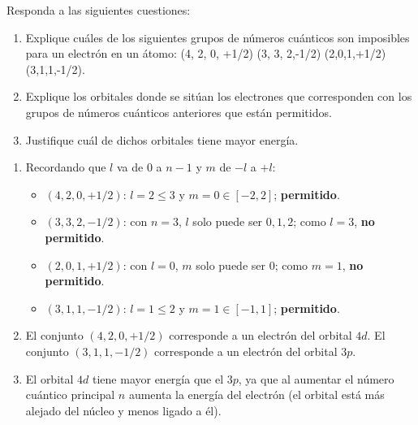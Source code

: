 \begin{exerciseEVAU}
    Responda a las siguientes cuestiones:
    \begin{enumerate}[label=\letraminuscula]
        \item Explique cuáles de los siguientes grupos de números cuánticos son imposibles para un
electrón en un átomo: (4, 2, 0, +1/2) (3, 3, 2,-1/2) (2,0,1,+1/2) (3,1,1,-1/2).
        \item Explique los orbitales donde se sitúan los electrones que corresponden con los grupos de números cuánticos anteriores que están permitidos.
        \item Justifique cuál de dichos orbitales tiene mayor energía.
    \end{enumerate}
    \begin{solu}
        \begin{enumerate}[label=\letraminuscula]
            \item Recordando que \(l\) va de \(0\) a \(n-1\) y \(m\) de \(-l\) a \(+l\):
            \begin{itemize}
                \item \((4,2,0,+1/2)\): \(l=2\leq 3\) y \(m=0\in[-2,2]\); \textbf{permitido}.
                \item \((3,3,2,-1/2)\): con \(n=3\), \(l\) solo puede ser \(0,1,2\); como \(l=3\), \textbf{no permitido}.
                \item \((2,0,1,+1/2)\): con \(l=0\), \(m\) solo puede ser \(0\); como \(m=1\), \textbf{no permitido}.
                \item \((3,1,1,-1/2)\): \(l=1\leq 2\) y \(m=1\in[-1,1]\); \textbf{permitido}.
            \end{itemize}
            \item El conjunto \((4,2,0,+1/2)\) corresponde a un electrón del orbital \(4d\). El conjunto \((3,1,1,-1/2)\) corresponde a un electrón del orbital \(3p\).
            \item El orbital \(4d\) tiene mayor energía que el \(3p\), ya que al aumentar el número cuántico principal \(n\) aumenta la energía del electrón (el orbital está más alejado del núcleo y menos ligado a él).
        \end{enumerate}
    \end{solu}
\end{exerciseEVAU}


